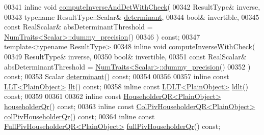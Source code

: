 \begin{DoxyCode}
00341     \textcolor{keyword}{inline} \textcolor{keywordtype}{void} \hyperlink{group___core___module_a7baaf2fdec0191a2166cf9fd84a2dcb2}{computeInverseAndDetWithCheck}(
00342       ResultType& inverse,
00343       \textcolor{keyword}{typename} ResultType::Scalar& \hyperlink{group___core___module_a7ad8f77004bb956b603bb43fd2e3c061}{determinant},
00344       \textcolor{keywordtype}{bool}& invertible,
00345       \textcolor{keyword}{const} RealScalar& absDeterminantThreshold = 
      \hyperlink{group___core___module_struct_eigen_1_1_num_traits}{NumTraits<Scalar>::dummy\_precision}()
00346     ) \textcolor{keyword}{const};
00347     \textcolor{keyword}{template}<\textcolor{keyword}{typename} ResultType>
00348     \textcolor{keyword}{inline} \textcolor{keywordtype}{void} \hyperlink{group___core___module_a116f3b50d2af7dbdf7473e517a5b8b0f}{computeInverseWithCheck}(
00349       ResultType& inverse,
00350       \textcolor{keywordtype}{bool}& invertible,
00351       \textcolor{keyword}{const} RealScalar& absDeterminantThreshold = 
      \hyperlink{group___core___module_struct_eigen_1_1_num_traits}{NumTraits<Scalar>::dummy\_precision}()
00352     ) \textcolor{keyword}{const};
00353     Scalar \hyperlink{group___core___module_a7ad8f77004bb956b603bb43fd2e3c061}{determinant}() \textcolor{keyword}{const};
00354 
00356 
00357     \textcolor{keyword}{inline} \textcolor{keyword}{const} \hyperlink{group___cholesky___module_class_eigen_1_1_l_l_t}{LLT<PlainObject>}  \hyperlink{group___core___module_a90c45f7a30265df792d5aeaddead2635}{llt}() \textcolor{keyword}{const};
00358     \textcolor{keyword}{inline} \textcolor{keyword}{const} \hyperlink{group___cholesky___module_class_eigen_1_1_l_d_l_t}{LDLT<PlainObject>} \hyperlink{group___core___module_a0ecf058a0727a4cab8b42d79e95072e1}{ldlt}() \textcolor{keyword}{const};
00359 
00361 
00362     \textcolor{keyword}{inline} \textcolor{keyword}{const} \hyperlink{group___q_r___module_class_eigen_1_1_householder_q_r}{HouseholderQR<PlainObject>} 
      \hyperlink{group___core___module_a9a9377aab1cea26db5f25bab7e682f8f}{householderQr}() \textcolor{keyword}{const};
00363     \textcolor{keyword}{inline} \textcolor{keyword}{const} \hyperlink{group___q_r___module_class_eigen_1_1_col_piv_householder_q_r}{ColPivHouseholderQR<PlainObject>} 
      \hyperlink{group___core___module_adee8c19c833245bbb00a591dce68e8a4}{colPivHouseholderQr}() \textcolor{keyword}{const};
00364     \textcolor{keyword}{inline} \textcolor{keyword}{const} \hyperlink{group___q_r___module_class_eigen_1_1_full_piv_householder_q_r}{FullPivHouseholderQR<PlainObject>} 
      \hyperlink{group___core___module_a863bc0e06b641a089508eabec6835ab2}{fullPivHouseholderQr}() \textcolor{keyword}{const};

\end{DoxyCode}

